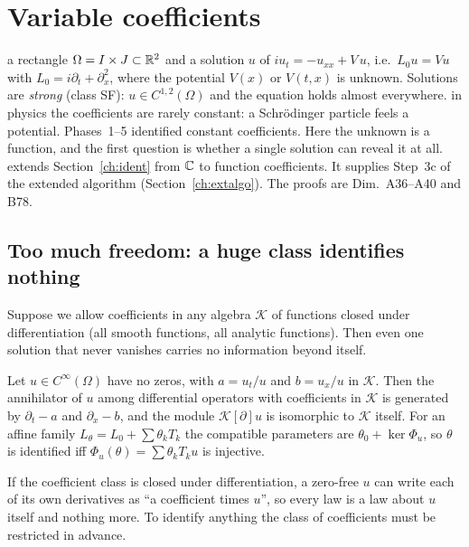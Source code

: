 \section{Variable coefficients}\label{ch:varcoef}
\sectionbrief
{a rectangle $\Omega=I\times J\subset\mathbb{R}^2$ and a solution $u$ of $iu_t=-u_{xx}+V\,u$, i.e.\ $L_0u=Vu$ with $L_0=i\partial_t+\partial_x^2$, where the potential $V(x)$ or $V(t,x)$ is unknown. Solutions are \emph{strong} (class SF): $u\in C^{1,2}(\Omega)$ and the equation holds almost everywhere.}
{in physics the coefficients are rarely constant: a Schr\"odinger particle feels a potential. Phases~1--5 identified constant coefficients. Here the unknown is a function, and the first question is whether a single solution can reveal it at all.}
{extends Section~\ref{ch:ident} from $\mathbb{C}$ to function coefficients. It supplies Step~3c of the extended algorithm (Section~\ref{ch:extalgo}). The proofs are Dim.~A36--A40 and B78.}

\subsection{Too much freedom: a huge class identifies nothing}

Suppose we allow coefficients in any algebra $\mathcal K$ of functions closed under differentiation (all smooth functions, all analytic functions). Then even one solution that never vanishes carries no information beyond itself.

\begin{theorem}\label{thm:varn1}
Let $u\in C^\infty(\Omega)$ have no zeros, with $a=u_t/u$ and $b=u_x/u$ in $\mathcal K$. Then the annihilator of $u$ among differential operators with coefficients in $\mathcal K$ is generated by $\partial_t-a$ and $\partial_x-b$, and the module $\mathcal K[\partial]u$ is isomorphic to $\mathcal K$ itself. For an affine family $L_\theta=L_0+\sum\theta_kT_k$ the compatible parameters are $\theta_0+\ker\Phi_u$, so $\theta$ is identified iff $\Phi_u(\theta)=\sum\theta_kT_ku$ is injective.
\end{theorem}

\begin{intuition}
If the coefficient class is closed under differentiation, a zero-free $u$ can write each of its own derivatives as ``a coefficient times $u$'', so every law is a law about $u$ itself and nothing more. To identify anything the class of coefficients must be restricted in advance.
\end{intuition}

